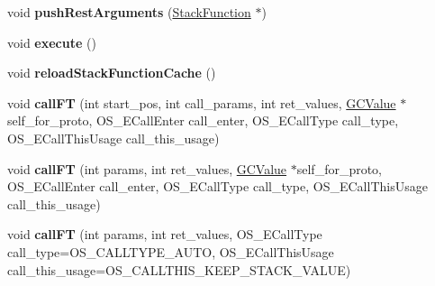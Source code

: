 \begin{DoxyCompactItemize}
\item 
void {\bfseries push\+Rest\+Arguments} (\hyperlink{struct_object_script_1_1_o_s_1_1_core_1_1_stack_function}{Stack\+Function} $\ast$)\hypertarget{class_object_script_1_1_o_s_1_1_core_a6dc5cab872f9d584c07d8f5548b29818}{}\label{class_object_script_1_1_o_s_1_1_core_a6dc5cab872f9d584c07d8f5548b29818}

\item 
void {\bfseries execute} ()\hypertarget{class_object_script_1_1_o_s_1_1_core_a164d5f5fe8bc3398fcd9f697d52bdee8}{}\label{class_object_script_1_1_o_s_1_1_core_a164d5f5fe8bc3398fcd9f697d52bdee8}

\item 
void {\bfseries reload\+Stack\+Function\+Cache} ()\hypertarget{class_object_script_1_1_o_s_1_1_core_ad37730d3427eeaf68bb6ae71b8bd9ae6}{}\label{class_object_script_1_1_o_s_1_1_core_ad37730d3427eeaf68bb6ae71b8bd9ae6}

\item 
void {\bfseries call\+FT} (int start\+\_\+pos, int call\+\_\+params, int ret\+\_\+values, \hyperlink{struct_object_script_1_1_o_s_1_1_core_1_1_g_c_value}{G\+C\+Value} $\ast$self\+\_\+for\+\_\+proto, O\+S\+\_\+\+E\+Call\+Enter call\+\_\+enter, O\+S\+\_\+\+E\+Call\+Type call\+\_\+type, O\+S\+\_\+\+E\+Call\+This\+Usage call\+\_\+this\+\_\+usage)\hypertarget{class_object_script_1_1_o_s_1_1_core_afce61371f73b48f1f3efea9ca4700323}{}\label{class_object_script_1_1_o_s_1_1_core_afce61371f73b48f1f3efea9ca4700323}

\item 
void {\bfseries call\+FT} (int params, int ret\+\_\+values, \hyperlink{struct_object_script_1_1_o_s_1_1_core_1_1_g_c_value}{G\+C\+Value} $\ast$self\+\_\+for\+\_\+proto, O\+S\+\_\+\+E\+Call\+Enter call\+\_\+enter, O\+S\+\_\+\+E\+Call\+Type call\+\_\+type, O\+S\+\_\+\+E\+Call\+This\+Usage call\+\_\+this\+\_\+usage)\hypertarget{class_object_script_1_1_o_s_1_1_core_aabd0e3fff9b0f5ccaa827f2b688ebc1e}{}\label{class_object_script_1_1_o_s_1_1_core_aabd0e3fff9b0f5ccaa827f2b688ebc1e}

\item 
void {\bfseries call\+FT} (int params, int ret\+\_\+values, O\+S\+\_\+\+E\+Call\+Type call\+\_\+type=O\+S\+\_\+\+C\+A\+L\+L\+T\+Y\+P\+E\+\_\+\+A\+U\+TO, O\+S\+\_\+\+E\+Call\+This\+Usage call\+\_\+this\+\_\+usage=O\+S\+\_\+\+C\+A\+L\+L\+T\+H\+I\+S\+\_\+\+K\+E\+E\+P\+\_\+\+S\+T\+A\+C\+K\+\_\+\+V\+A\+L\+UE)\hypertarget{class_object_script_1_1_o_s_1_1_core_ae7b21ba56e7fb620e39f32a91f7d13f0}{}\label{class_object_script_1_1_o_s_1_1_core_ae7b21ba56e7fb620e39f32a91f7d13f0}


\end{DoxyCompactItemize}
